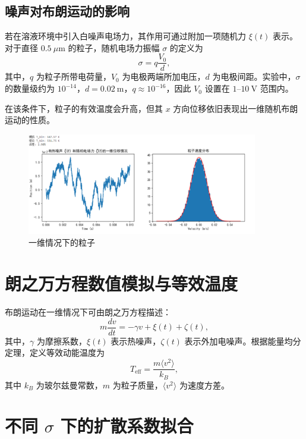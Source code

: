 \documentclass[a4paper]{report} %
\begin{document}
\subsection{噪声对布朗运动的影响}

若在溶液环境中引入白噪声电场力，其作用可通过附加一项随机力 $\xi(t)$ 表示。对于直径 $0.5~\mu\text{m}$ 的粒子，随机电场力振幅 $\sigma$ 的定义为
\begin{equation}
  \sigma = q \frac{V_0}{d},
\end{equation}
其中，$q$ 为粒子所带电荷量，$V_0$ 为电极两端所加电压，$d$ 为电极间距。实验中，$\sigma$ 的数量级约为 $10^{-14}$，$d = 0.02~\text{m}$，$q \approx 10^{-16}$，因此 $V_0$ 设置在 $1$--$10~\text{V}$ 范围内。

在该条件下，粒子的有效温度会升高，但其 $x$ 方向位移依旧表现出一维随机布朗运动的性质。
\begin{figure}[htbp]
  \centering
  \includegraphics[width=0.9\textwidth]{一维位移.png}
  \caption{一维情况下的粒子}
  \label{fig:一维位移}
\end{figure}

\section{朗之万方程数值模拟与等效温度}

布朗运动在一维情况下可由朗之万方程描述：
\begin{equation}
  m \frac{dv}{dt} = -\gamma v + \xi(t) + \zeta(t),
\end{equation}
其中，$\gamma$ 为摩擦系数，$\xi(t)$ 表示热噪声，$\zeta(t)$ 表示外加电噪声。根据能量均分定理，定义等效动能温度为
\begin{equation}
  T_{\text{eff}} = \frac{m \langle v^2 \rangle}{k_B},
\end{equation}
其中 $k_B$ 为玻尔兹曼常数，$m$ 为粒子质量，$\langle v^2 \rangle$ 为速度方差。

\section{不同 $\sigma$ 下的扩散系数拟合}
\end{document}

